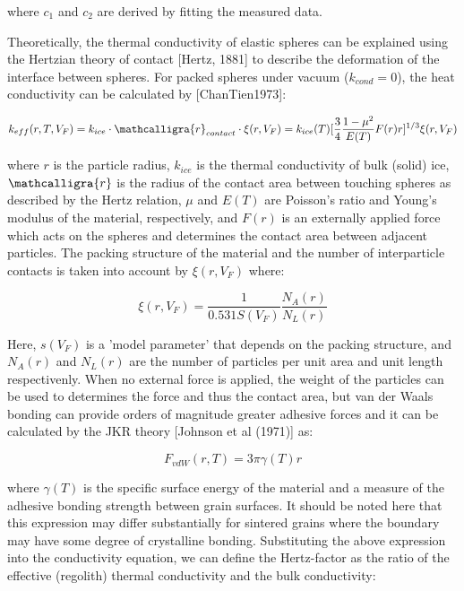 \documentclass[11pt]{article} %
\newcommand{\vf}{\ensuremath{V_{F}}\xspace}
\newcommand{\sr}{\ensuremath{\mathcalligra{r}} \xspace}
\begin{document}
	where $c_{1}$ and $c_{2}$ are derived by fitting the measured data.
	
	Theoretically, the thermal conductivity of elastic spheres can be explained using the Hertzian theory of contact [Hertz, 1881] to describe the deformation of the interface between spheres. For packed spheres under vacuum ($k_{cond} = 0$), the heat conductivity can be calculated by [ChanTien1973]:
	
	\begin{equation}
	k_{eff}(r, T, \vf) = k_{ice}\cdot \sr_{contact}\cdot \xi(r, \vf)= k_{ice}(T) [\frac{3}{4} \frac{1 - \mu^{2}}{E(T)} F(r) r]^{1/3} \xi(r, \vf)
	\end{equation}
	
	 where $r$ is the particle radius, $k_{ice}$ is the thermal conductivity of bulk (solid) ice, $\sr$ is the radius of the contact area between touching spheres as described by the Hertz relation, $\mu$ and $E(T)$ are Poisson's ratio and Young's modulus of the material, respectively, and $F(r)$ is an externally applied force which acts on the spheres and determines the contact area between adjacent particles. The packing structure of the material and the number of interparticle contacts is taken into account by $\xi(r, \vf)$ where:
	
	\begin{equation}
	\xi(r, \vf) = \frac{1}{0.531 S(\vf)} \frac{N_{A}(r)}{N_{L}(r)}
	\end{equation}
	 
	 Here, $s(\vf)$ is a 'model parameter' that depends on the packing structure, and $N_{A}(r)$ and $N_{L}(r)$ are the number of particles per unit area and unit length respectivenly.  When no external force is applied, the weight of the particles can be used to determines the force and thus the contact area, but van der Waals bonding can provide orders of magnitude greater adhesive forces and it can be calculated by the JKR theory [Johnson et al (1971)] as:
	 
	 \begin{equation}
	 F_{vdW}(r, T) = 3 \pi \gamma(T) r
	 \end{equation} 
	 
	 where $\gamma(T)$ is the specific surface energy of the material and a measure of the adhesive bonding strength between grain surfaces. It should be noted here that this expression may differ substantially for sintered grains where the boundary may have some degree of crystalline bonding. Substituting the above expression into the conductivity equation, we can define the Hertz-factor as the ratio of the effective (regolith) thermal conductivity and the bulk conductivity:
	 
\end{document}
